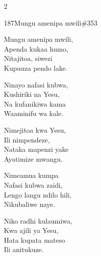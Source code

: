 \begin{multicols}{2}
\begin{hymn}{187}{Mungu amenipa mwili}{\#353}
\begin{stanza}
Mungu amenipa mwili,\\
Apenda kukaa humo,\\
Nitajitoa, siwezi\\
Kupuuza pendo lake.
\end{stanza}
\begin{chorus}
Ninayo nafasi kubwa,\\
Kushiriki na Yesu,\\
Na kufanikiwa kama\\
Waaminifu wa kale.
\end{chorus}
\begin{stanza}
Nimejitoa kwa Yesu,\\
Ili nimpendeze,\\
Nataka mapenzi yake\\
Ayatimize mwangu.
\end{stanza}
\begin{stanza}
Nimeamua kumpa\\
Nafasi kubwa zaidi,\\
Lengo langu ndilo hili,\\
Nikubaliwe naye.
\end{stanza}
\begin{stanza}
Niko radhi kulaumiwa,\\
Kwa ajili ya Yesu,\\
Hata kupata mateso\\
Ili anitukuze.
\end{stanza}
\end{hymn}


\end{multicols}
